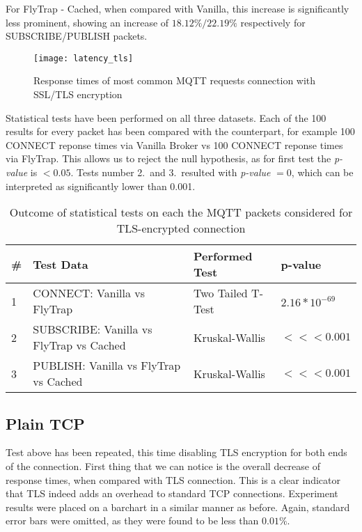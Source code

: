 For FlyTrap - Cached, when compared with Vanilla, this increase is significantly less prominent, showing an increase of $18.12\%/22.19\%$ respectively for SUBSCRIBE/PUBLISH packets. 
\begin{figure}[h]
    \centering
    \texttt{[image: latency\_tls]}
    \caption{Response times of most common MQTT requests connection with SSL/TLS encryption}
    \label{fig:latency_tls}
\end{figure}

Statistical tests have been performed on all three datasets. Each of the 100 results for every packet has been compared with the counterpart, for example 100 CONNECT reponse times via Vanilla Broker vs 100 CONNECT reponse times via FlyTrap. This allows us to reject the null hypothesis, as for first test the \textit{p-value} is $<0.05$. Tests number 2.\ and 3.\ resulted with \textit{p-value} $=0$, which can be interpreted as significantly lower than 0.001.

\begin{table}[h]
\centering
\begin{tabular}{|l|l|l|l|}
\hline
\textbf{\#} & \textbf{Test Data}                       & \textbf{Performed Test} & \textbf{p-value}                      \\ \hline
1           & CONNECT: Vanilla vs FlyTrap              & Two Tailed T-Test       & $2.16*10^{-69}$                    \\ \hline
2           & SUBSCRIBE: Vanilla vs FlyTrap vs Cached & Kruskal-Wallis          & $<<< 0.001$ \\ \hline
3           & PUBLISH: Vanilla vs FlyTrap vs Cached & Kruskal-Wallis          & $<<< 0.001$ \\ \hline
\end{tabular}
\caption{Outcome of statistical tests on each the MQTT packets considered for TLS-encrypted connection}
\label{tab:ttest-tls}
\end{table}
\subsection{Plain TCP}

Test above has been repeated, this time disabling TLS encryption for both ends of the connection. First thing that we can notice is the overall decrease of response times, when compared with TLS connection. This is a clear indicator that TLS indeed adds an overhead to standard TCP connections. Experiment results were placed on a barchart in a similar manner as before. Again, standard error bars were omitted, as they were found to be less than $0.01\%$.

